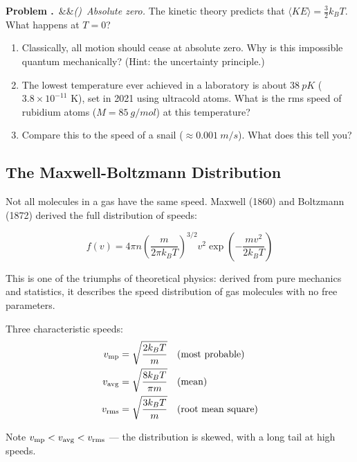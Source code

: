 \documentclass[12pt, a4paper, twoside]{book}
\newcounter{problem}[chapter]
\newcommand{\problem}[1][]{\refstepcounter{problem}\medskip\noindent
  \textcolor{accent}{\textbf{Problem \theproblem.}}\ \ifx&#1&\else\textit{(#1)}\ \fi}
\begin{document}
\begin{explobox}
\problem \textit{Absolute zero.} The kinetic theory predicts that $\langle KE \rangle = \frac{3}{2}k_BT$. What happens at $T = 0$?
\begin{enumerate}[label=(\alph*)]
  \item Classically, all motion should cease at absolute zero. Why is this impossible quantum mechanically? (Hint: the uncertainty principle.)
  \item The lowest temperature ever achieved in a laboratory is about $\SI{38}{pK}$ ($3.8 \times 10^{-11}$ K), set in 2021 using ultracold atoms. What is the rms speed of rubidium atoms ($M = \SI{85}{g/mol}$) at this temperature?
  \item Compare this to the speed of a snail ($\approx \SI{0.001}{m/s}$). What does this tell you?
\end{enumerate}
\end{explobox}

\subsection{The Maxwell-Boltzmann Distribution}

Not all molecules in a gas have the same speed. Maxwell (1860) and Boltzmann (1872) derived the full distribution of speeds:

\begin{equation}
  f(v) = 4\pi n \left(\frac{m}{2\pi k_BT}\right)^{3/2} v^2 \exp\!\left(-\frac{mv^2}{2k_BT}\right)
\end{equation}

This is one of the triumphs of theoretical physics: derived from pure mechanics and statistics, it describes the speed distribution of gas molecules with no free parameters.

Three characteristic speeds:
\begin{align}
  v_{\rm mp} &= \sqrt{\frac{2k_BT}{m}} \quad\text{(most probable)} \\
  v_{\rm avg} &= \sqrt{\frac{8k_BT}{\pi m}} \quad\text{(mean)} \\
  v_{\rm rms} &= \sqrt{\frac{3k_BT}{m}} \quad\text{(root mean square)}
\end{align}

Note $v_{\rm mp} < v_{\rm avg} < v_{\rm rms}$ --- the distribution is skewed, with a long tail at high speeds.
\end{document}
